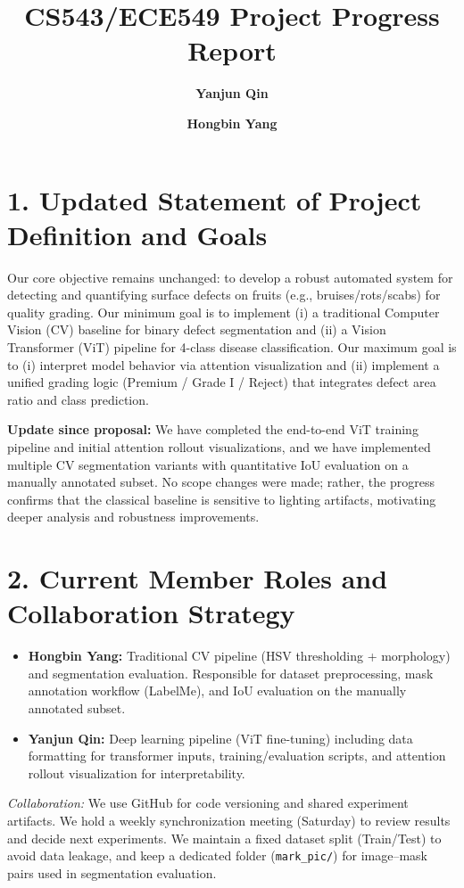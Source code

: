 \documentclass[11pt,letterpaper]{article}
\title{\vspace{-1.5cm}\textbf{CS543/ECE549 Project Progress Report}}
\author{\textbf{Yanjun Qin} \and \textbf{Hongbin Yang}}
\date{}
\begin{document}
\maketitle
\vspace{-2cm} 

\section*{1. Updated Statement of Project Definition and Goals}
Our core objective remains unchanged: to develop a robust automated system for detecting and quantifying surface defects on fruits (e.g., bruises/rots/scabs) for quality grading. Our minimum goal is to implement (i) a traditional Computer Vision (CV) baseline for binary defect segmentation and (ii) a Vision Transformer (ViT) pipeline for 4-class disease classification. Our maximum goal is to (i) interpret model behavior via attention visualization and (ii) implement a unified grading logic (Premium / Grade I / Reject) that integrates defect area ratio and class prediction.

\textbf{Update since proposal:} We have completed the end-to-end ViT training pipeline and initial attention rollout visualizations, and we have implemented multiple CV segmentation variants with quantitative IoU evaluation on a manually annotated subset. No scope changes were made; rather, the progress confirms that the classical baseline is sensitive to lighting artifacts, motivating deeper analysis and robustness improvements.

\section*{2. Current Member Roles and Collaboration Strategy}
\begin{itemize}[noitemsep, topsep=0pt]
    \item \textbf{Hongbin Yang:} Traditional CV pipeline (HSV thresholding + morphology) and segmentation evaluation. Responsible for dataset preprocessing, mask annotation workflow (LabelMe), and IoU evaluation on the manually annotated subset.
    \item \textbf{Yanjun Qin:} Deep learning pipeline (ViT fine-tuning) including data formatting for transformer inputs, training/evaluation scripts, and attention rollout visualization for interpretability.
\end{itemize}
\textit{Collaboration:} We use GitHub for code versioning and shared experiment artifacts. We hold a weekly synchronization meeting (Saturday) to review results and decide next experiments. We maintain a fixed dataset split (Train/Test) to avoid data leakage, and keep a dedicated folder (\texttt{mark\_pic/}) for image--mask pairs used in segmentation evaluation.
\end{document}
